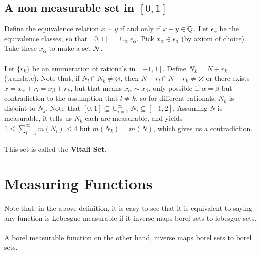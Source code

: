 \documentclass[main.tex]{subfiles}
\begin{document}
\subsection{A non measurable set in $[0,1]$}
Define the equivalence relation $x \sim y$ if and only if $x-y \in \mathbb Q$. Let $\epsilon_{\alpha}$ be the equivalence classes, so that $[0,1]=\cup_{\alpha} \epsilon_{\alpha}$. Pick $x_{\alpha}\in \epsilon_{\alpha}$ (by axiom of choice). Take these $x_{\alpha}$ to make a set $\mathcal N$.
\\\\ Let $\{r_k\}$ be an enumeration of rationals in $[-1,1]$. Define $N_k=N+r_k$ (translate). Note that, if $N_l\cap N_k\neq \varnothing$, then $N+r_l\cap N+r_k \neq \varnothing$ or there exists $x=x_{\alpha}+r_l=x_{\beta}+r_k$, but that means $x_{\alpha}\sim x_{\beta}$, only possible if $\alpha=\beta$ but contradiction to the assumption that $l \neq k$, so for different rationals, $N_k$ is disjoint to $N_j$. Note that $[0,1]\subseteq \cup_{i=1}^{\infty}N_i \subseteq [-1,2]$. Assuming $N$ is measurable, it tells us $N_k $ each are measurable, and yields $1 \leq \sum_{i=1}^{\infty} m(N_i)\leq 4$ but $m(N_k)=m(N)$, which gives us a contradiction. 
\\\\ This set is called the \textbf{Vitali Set}. 

\section{Measuring Functions}
\defn{Measurable Function}{A function $f:\RR^d \to \RR\cup \{-\infty,\infty\}$ is said to be \emph{measurable} if $f^{-1}([-\infty,a))$ is measurable in $\RR^d$.}
\begin{remark}
    Note that, in the above definition, it is easy to see that it is equivalent to saying any function is Lebesgue measurable if it inverse maps borel sets to lebesgue sets. 
    \\\\ A borel measurable function on the other hand, inverse maps borel sets to borel sets.
\end{remark} 
\end{document}
